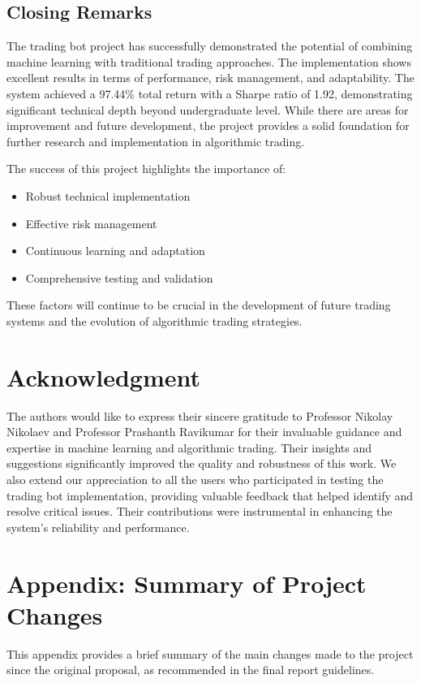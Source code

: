 \documentclass[conference]{IEEEtran}
\begin{document}
\subsection{Closing Remarks}
The trading bot project has successfully demonstrated the potential of combining machine learning with traditional trading approaches. The implementation shows excellent results in terms of performance, risk management, and adaptability. The system achieved a 97.44\% total return with a Sharpe ratio of 1.92, demonstrating significant technical depth beyond undergraduate level. While there are areas for improvement and future development, the project provides a solid foundation for further research and implementation in algorithmic trading.

The success of this project highlights the importance of:
\begin{itemize}
    \item Robust technical implementation
    \item Effective risk management
    \item Continuous learning and adaptation
    \item Comprehensive testing and validation
\end{itemize}

These factors will continue to be crucial in the development of future trading systems and the evolution of algorithmic trading strategies.

\section*{Acknowledgment}
The authors would like to express their sincere gratitude to Professor Nikolay Nikolaev and Professor Prashanth Ravikumar for their invaluable guidance and expertise in machine learning and algorithmic trading. Their insights and suggestions significantly improved the quality and robustness of this work. We also extend our appreciation to all the users who participated in testing the trading bot implementation, providing valuable feedback that helped identify and resolve critical issues. Their contributions were instrumental in enhancing the system's reliability and performance.

\section*{Appendix: Summary of Project Changes}
This appendix provides a brief summary of the main changes made to the project since the original proposal, as recommended in the final report guidelines.
\end{document}
